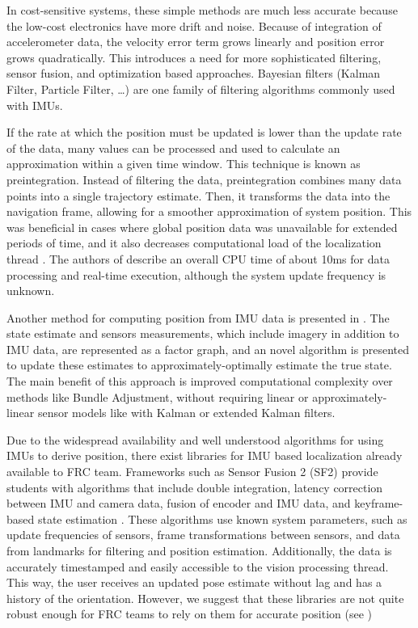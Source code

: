 \documentclass{article}
\begin{document}
    In cost-sensitive systems, these simple methods are much less accurate because the low-cost electronics have more drift and noise. Because of integration of accelerometer data, the velocity error term grows linearly and position error grows quadratically. This introduces a need for more sophisticated filtering, sensor fusion, and optimization based approaches. Bayesian filters (Kalman Filter, Particle Filter, \dots) are one family of filtering algorithms commonly used with IMUs.

    If the rate at which the position must be updated is lower than the update rate of the data, many values can be processed and used to calculate an approximation within a given time window. This technique is known as preintegration. Instead of filtering the data, preintegration combines many data points into a single trajectory estimate. Then, it transforms the data into the navigation frame, allowing for a smoother approximation of system position. This was beneficial in cases where global position data was unavailable for extended periods of time, and it also decreases computational load of the localization thread \cite{lupton_visual-inertial-aided_2012}. The authors of \cite{lupton_visual-inertial-aided_2012} describe an overall CPU time of about 10ms for data processing and real-time execution, although the system update frequency is unknown. %

    Another method for computing position from IMU data is presented in \cite{vadim_indelman_information_2013}. The state estimate and sensors measurements, which include imagery in addition to IMU data, are represented as a factor graph, and an novel algorithm is presented to update these estimates to approximately-optimally estimate the true state. The main benefit of this approach is improved computational complexity over methods like Bundle Adjustment, without requiring linear or approximately-linear sensor models like with Kalman or extended Kalman filters.

    Due to the widespread availability and well understood algorithms for using IMUs to derive position, there exist libraries for IMU based localization already available to FRC team. Frameworks such as Sensor Fusion 2 (SF2) provide students with algorithms that include double integration, latency correction between IMU and camera data, fusion of encoder and IMU data, and keyframe-based state estimation \cite{kauai_labs_inc_video_2017}. These algorithms use known system parameters, such as update frequencies of sensors, frame transformations between sensors, and data from landmarks for filtering and position estimation. Additionally, the data is accurately timestamped and easily accessible to the vision processing thread. This way, the user receives an updated pose estimate without lag and has a history of the orientation. However, we suggest that these libraries are not quite robust enough for FRC teams to rely on them for accurate position (see )
\end{document}
